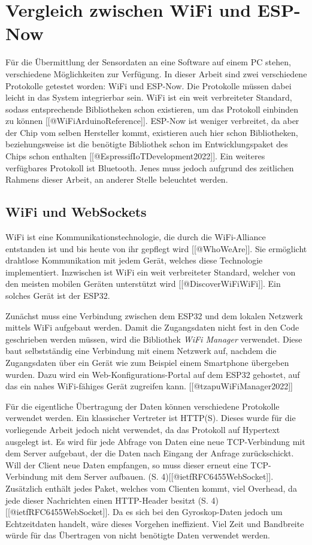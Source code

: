 \section{Vergleich zwischen WiFi und ESP-Now}
Für die Übermittlung der Sensordaten an eine Software auf einem PC stehen, verschiedene Möglichkeiten zur Verfügung.
In dieser Arbeit sind zwei verschiedene Protokolle getestet worden: WiFi und ESP-Now. Die Protokolle müssen dabei leicht in das System integrierbar sein.
WiFi ist ein weit verbreiteter Standard, sodass entsprechende Bibliotheken schon existieren, um das Protokoll einbinden zu können [[@WiFiArduinoReference]].
ESP-Now ist weniger verbreitet, da aber der Chip vom selben Hersteller kommt, existieren auch hier schon Bibliotheken, beziehungsweise ist die benötigte Bibliothek schon im Entwicklungspaket des Chips schon enthalten [[@EspressifIoTDevelopment2022]].
Ein weiteres verfügbares Protokoll ist Bluetooth.
Jenes muss jedoch aufgrund des zeitlichen Rahmens dieser Arbeit, an anderer Stelle beleuchtet werden.

\subsection{WiFi und WebSockets}
WiFi ist eine Kommunikationstechnologie, die durch die WiFi-Alliance entstanden ist und bis heute von ihr gepflegt wird [[@WhoWeAre]].
Sie ermöglicht drahtlose Kommunikation mit jedem Gerät, welches diese Technologie implementiert.
Inzwischen ist WiFi ein weit verbreiteter Standard, welcher von den meisten mobilen Geräten unterstützt wird [[@DiscoverWiFiWiFi]].
Ein solches Gerät ist der ESP32.

Zunächst muss eine Verbindung zwischen dem ESP32 und dem lokalen Netzwerk mittels WiFi aufgebaut werden.
Damit die Zugangsdaten nicht fest in den Code geschrieben werden müssen, wird die Bibliothek \textit{WiFi Manager} verwendet.
Diese baut selbstständig eine Verbindung mit einem Netzwerk auf, nachdem die Zugangsdaten über ein Gerät wie zum Beispiel einem Smartphone übergeben wurden.
Dazu wird ein Web-Konfigurations-Portal auf dem ESP32 gehostet, auf das ein nahes WiFi-fähiges Gerät zugreifen kann. [[@tzapuWiFiManager2022]]

Für die eigentliche Übertragung der Daten können verschiedene Protokolle verwendet werden.
Ein klassischer Vertreter ist HTTP(S).
Dieses wurde für die vorliegende Arbeit jedoch nicht verwendet, da das Protokoll auf Hypertext ausgelegt ist.
Es wird für jede Abfrage von Daten eine neue TCP-Verbindung mit dem Server aufgebaut, der die Daten nach Eingang der Anfrage zurückschickt.
Will der Client neue Daten empfangen, so muss dieser erneut eine TCP-Verbindung mit dem Server aufbauen. (S. 4)[[@ietfRFC6455WebSocket]].
Zusätzlich enthält jedes Paket, welches vom Clienten kommt, viel Overhead, da jede dieser Nachrichten einen HTTP-Header besitzt (S. 4)[[@ietfRFC6455WebSocket]].
Da es sich bei den Gyroskop-Daten jedoch um Echtzeitdaten handelt, wäre dieses Vorgehen ineffizient.
Viel Zeit und Bandbreite würde für das Übertragen von nicht benötigte Daten verwendet werden.

